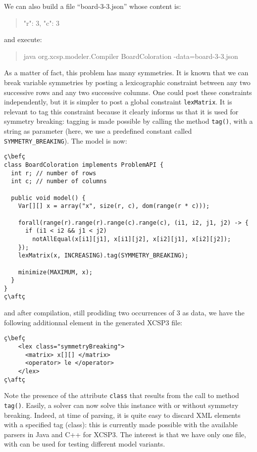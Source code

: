\documentclass[10pt]{article}
\def\xt{{\rm XCSP3}\xspace}
\newcommand{\gb}[1]{{\tt #1}} %
\newcommand{\nn}[1]{{\tt #1}} %
\def\xt{{\rm XCSP3}\xspace}
\newenvironment{myvb}{\endgraf\small\verbatim}{\endverbatim}
\def\bef{\rule{10cm}{0.1mm}} %
\def\aft{\rule{10cm}{0.1mm}\medskip}
\begin{document}
We can also build a file ``board-3-3.json'' whose content is:
\begin{quote}
\begin{myvb}
{
  "r": 3,
  "c": 3
}
\end{myvb}
\end{quote}
and execute:
\begin{quote}
\begin{myvb}
java org.xcsp.modeler.Compiler BoardColoration -data=board-3-3.json
\end{myvb}
\end{quote}


As a matter of fact, this problem has many symmetries.
It is known that we can break variable symmetries by posting a lexicographic constraint between any two successive rows and any two successive columns.
One could post these constraints independently, but it is simpler to post a global constraint \gb{lexMatrix}.
It is relevant to tag this constraint because it clearly informs us that it is used for symmetry breaking: tagging is made possible by calling the method \nn{tag()}, with a string as parameter (here, we use a predefined constant called \texttt{SYMMETRY\_BREAKING}). 
The model is now:

\begin{lstlisting}
ç\befç
class BoardColoration implements ProblemAPI {
  int r; // number of rows 
  int c; // number of columns

  public void model() {
    Var[][] x = array("x", size(r, c), dom(range(r * c)));
    
    forall(range(r).range(r).range(c).range(c), (i1, i2, j1, j2) -> {
      if (i1 < i2 && j1 < j2)
        notAllEqual(x[i1][j1], x[i1][j2], x[i2][j1], x[i2][j2]);
    });
    lexMatrix(x, INCREASING).tag(SYMMETRY_BREAKING);

    minimize(MAXIMUM, x);
  }
}
ç\aftç
\end{lstlisting}

and after compilation, still prodiding two occurrences of 3 as data, we have the following additionnal element in the generated \xt file:

\begin{lstlisting}
ç\befç
    <lex class="symmetryBreaking">
      <matrix> x[][] </matrix>
      <operator> le </operator>
    </lex>
ç\aftç
\end{lstlisting}


Note the presence of the attribute \nn{class} that results from the call to method \nn{tag()}.
Easily, a solver can now solve this instance with or without symmetry breaking.
Indeed, at time of parsing, it is quite easy to discard XML elements with a specified tag (class): this is currently made possible with the available parsers in Java and C++ for \xt.
The interest is that we have only one file, with can be used for testing different model variants. 
\end{document}

